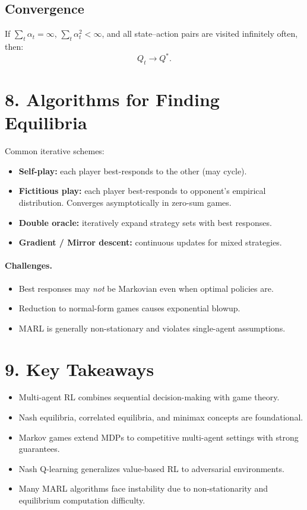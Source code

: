 \documentclass[12pt]{article}
\begin{document}
\subsection*{Convergence}
If $\sum_t \alpha_t = \infty$, $\sum_t \alpha_t^2 < \infty$, and all state–action pairs are visited
infinitely often, then:
\[
		Q_t \to Q^*.
\]

\section*{8. Algorithms for Finding Equilibria}

Common iterative schemes:
\begin{itemize}
		\item \textbf{Self-play:} each player best-responds to the other (may cycle).
		\item \textbf{Fictitious play:} each player best-responds to opponent’s empirical distribution. Converges
				asymptotically in zero-sum games.
		\item \textbf{Double oracle:} iteratively expand strategy sets with best responses.
		\item \textbf{Gradient / Mirror descent:} continuous updates for mixed strategies.
\end{itemize}

\paragraph{Challenges.}
\begin{itemize}
		\item Best responses may \emph{not} be Markovian even when optimal policies are.
		\item Reduction to normal-form games causes exponential blowup.
		\item MARL is generally non-stationary and violates single-agent assumptions.
\end{itemize}

\section*{9. Key Takeaways}
\begin{itemize}
		\item Multi-agent RL combines sequential decision-making with game theory.
		\item Nash equilibria, correlated equilibria, and minimax concepts are foundational.
		\item Markov games extend MDPs to competitive multi-agent settings with strong guarantees.
		\item Nash Q-learning generalizes value-based RL to adversarial environments.
		\item Many MARL algorithms face instability due to non-stationarity and equilibrium computation difficulty.
\end{itemize}
\end{document}
